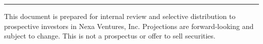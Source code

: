 \begin{titlepage}
  \vfill

  \textcolor{nexaAqua}{\rule{\linewidth}{1pt}}
  \vspace{0.3cm}
  {\footnotesize\color{nexaMidGray}
    This document is prepared for internal review and selective distribution to prospective
    investors in Nexa Ventures, Inc. Projections are forward-looking and subject to change.
    This is not a prospectus or offer to sell securities.%
  }
  \vspace{0.3cm}
\end{titlepage}

\nopagecolor
